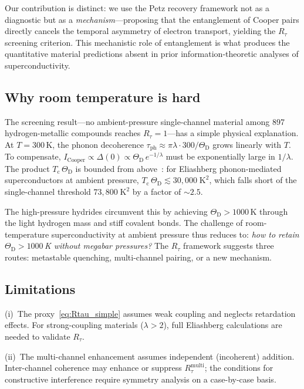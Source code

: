 \documentclass[prb,twocolumn,superscriptaddress,longbibliography,floatfix]{revtex4-2}
\newcommand{\tauasym}{\tau}
\newcommand{\taudec}{\tauasym_{\mathrm{ph}}}
\newcommand{\Icoop}{I_{\mathrm{Cooper}}}
\newcommand{\Rtau}{R_{\tauasym}}
\newcommand{\Tc}{T_{\mathrm{c}}}
\newcommand{\ThetaD}{\Theta_{\mathrm{D}}}
\begin{document}
Our contribution is distinct: we use the Petz recovery framework
not as a diagnostic but as a \emph{mechanism}---proposing that
the entanglement of Cooper pairs directly cancels the temporal
asymmetry of electron transport, yielding the $\Rtau$ screening
criterion.  This mechanistic role of entanglement is what
produces the quantitative material predictions absent in prior
information-theoretic analyses of superconductivity.

\subsection{Why room temperature is hard}

The screening result---no ambient-pressure single-channel
material among 897 hydrogen-metallic compounds reaches
$\Rtau = 1$---has a simple physical explanation.
At $T = 300\,$K, the phonon decoherence
$\taudec \approx \pi\lambda \cdot 300/\ThetaD$ grows linearly
with $T$.  To compensate, $\Icoop \propto \Delta(0) \propto
\ThetaD\, e^{-1/\lambda}$ must be exponentially large in
$1/\lambda$.  The product $\Tc\, \ThetaD$ is bounded from
above~\cite{Gao2025}: for Eliashberg phonon-mediated
superconductors at ambient pressure, $\Tc\, \ThetaD \lesssim
30{,}000\;\mathrm{K}^2$, which falls short of the single-channel
threshold $73{,}800\;\mathrm{K}^2$ by a factor of $\sim 2.5$.

The high-pressure hydrides circumvent this by achieving
$\ThetaD > 1000\,$K through the light hydrogen mass and
stiff covalent bonds.  The challenge of room-temperature
superconductivity at ambient pressure thus reduces to:
\emph{how to retain $\ThetaD > 1000\,$K without megabar
pressures?}  The $\Rtau$ framework suggests three routes:
metastable quenching, multi-channel pairing, or a new
mechanism.

\subsection{Limitations}

(i)~The proxy~\eqref{eq:Rtau_simple} assumes weak coupling
and neglects retardation effects.  For strong-coupling
materials ($\lambda > 2$), full Eliashberg calculations are
needed to validate $\Rtau$.

(ii)~The multi-channel enhancement assumes independent
(incoherent) addition.  Inter-channel coherence may enhance or
suppress $\Rtau^{\mathrm{multi}}$; the conditions for constructive
interference require symmetry analysis on a case-by-case basis.
\end{document}
